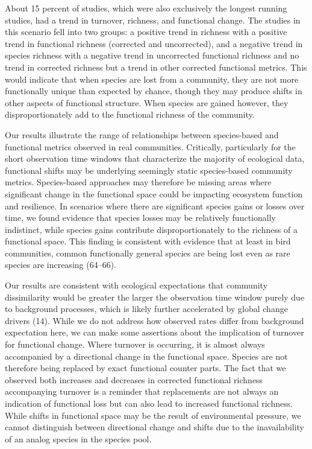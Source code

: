\documentclass{article}
\begin{document}
About 15 percent of studies, which were also exclusively the longest
running studies, had a trend in turnover, richness, and functional
change. The studies in this scenario fell into two groups: a positive
trend in richness with a positive trend in functional richness
(corrected and uncorrected), and a negative trend in species richness
with a negative trend in uncorrected functional richness and no trend in
corrected richness but a trend in other corrected functional metrics.
This would indicate that when species are lost from a community, they
are not more functionally unique than expected by chance, though they
may produce shifts in other aspects of functional structure. When
species are gained however, they disproportionately add to the
functional richness of the community.

Our results illustrate the range of relationships between species-based
and functional metrics observed in real communities. Critically,
particularly for the short observation time windows that characterize
the majority of ecological data, functional shifts may be underlying
seemingly static species-based community metrics. Species-based
approaches may therefore be missing areas where significant change in
the functional space could be impacting ecosystem function and
resilience. In scenarios where there are significant species gains or
losses over time, we found evidence that species losses may be
relatively functionally indistinct, while species gains contribute
disproportionately to the richness of a functional space. This finding
is consistent with evidence that at least in bird communities, common
functionally general species are being lost even as rare species are
increasing (64--66).

Our results are consistent with ecological expectations that community
dissimilarity would be greater the larger the observation time window
purely due to background processes, which is likely further accelerated
by global change drivers (14). While we do not address how observed
rates differ from background expectation here, we can make some
assertions about the implication of turnover for functional change.
Where turnover is occurring, it is almost always accompanied by a
directional change in the functional space. Species are not therefore
being replaced by exact functional counter parts. The fact that we
observed both increases and decreases in corrected functional richness
accompanying turnover is a reminder that replacements are not always an
indication of functional loss but can also lead to increased functional
richness. While shifts in functional space may be the result of
environmental pressure, we cannot distinguish between directional change
and shifts due to the inavailability of an analog species in the species
pool.
\end{document}
